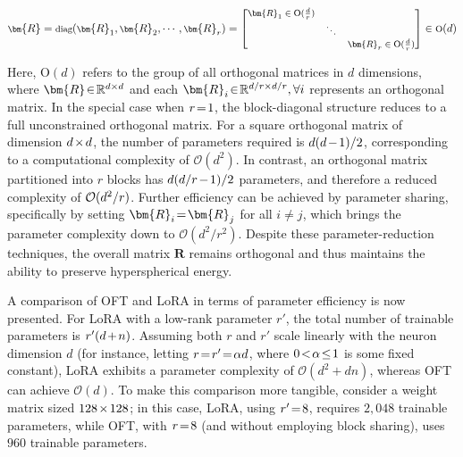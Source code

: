 \begin{equation}
    \footnotesize
    \bm{R} = \text{diag}(\bm{R}_1, \bm{R}_2, \cdots, \bm{R}_r) = \begin{bmatrix}
    \bm{R}_1 \in \text{O}(\frac{d}{r}) & & \\
    & \ddots & \\
    & & \bm{R}_r \in \text{O}(\frac{d}{r})
    \end{bmatrix} \in \text{O}(d)
\end{equation}

Here, $\text{O}(d)$ refers to the group of all orthogonal matrices in $d$ dimensions, where $\thickmuskip=2mu \medmuskip=2mu \bm{R}\in\mathbb{R}^{d\times d}$ and each $\thickmuskip=2mu \medmuskip=2mu \bm{R}_i\in\mathbb{R}^{d/r\times d/r},\forall i$ represents an orthogonal matrix. In the special case when $\thickmuskip=2mu \medmuskip=2mu r=1$, the block-diagonal structure reduces to a full unconstrained orthogonal matrix. For a square orthogonal matrix of dimension $\thickmuskip=2mu \medmuskip=2mu d\times d$, the number of parameters required is $\thickmuskip=2mu \medmuskip=2mu d(d-1)/2$, corresponding to a computational complexity of $\mathcal{O}(d^2)$. In contrast, an orthogonal matrix partitioned into $r$ blocks has $\thickmuskip=2mu \medmuskip=2mu d(d/r-1)/2$ parameters, and therefore a reduced complexity of $\thickmuskip=2mu \medmuskip=2mu \mathcal{O}(d^2/r)$. Further efficiency can be achieved by parameter sharing, specifically by setting $\thickmuskip=2mu \medmuskip=2mu \bm{R}_i = \bm{R}_j$ for all $i \neq j$, which brings the parameter complexity down to $\mathcal{O}(d^2/r^2)$. Despite these parameter-reduction techniques, the overall matrix $\bm{R}$ remains orthogonal and thus maintains the ability to preserve hyperspherical energy.

A comparison of OFT and LoRA in terms of parameter efficiency is now presented. For LoRA with a low-rank parameter $r'$, the total number of trainable parameters is $\thickmuskip=2mu \medmuskip=2mu r'(d+n)$. Assuming both $r$ and $r'$ scale linearly with the neuron dimension $d$ (for instance, letting $\thickmuskip=2mu \medmuskip=2mu r=r'=\alpha d$, where $\thickmuskip=2mu \medmuskip=2mu 0<\alpha\leq 1$ is some fixed constant), LoRA exhibits a parameter complexity of $\mathcal{O}(d^2+dn)$, whereas OFT can achieve $\mathcal{O}(d)$. To make this comparison more tangible, consider a weight matrix sized $\thickmuskip=2mu \medmuskip=2mu 128\times 128$; in this case, LoRA, using $\thickmuskip=2mu \medmuskip=2mu r'=8$, requires $2,048$ trainable parameters, while OFT, with $\thickmuskip=2mu \medmuskip=2mu r=8$ (and without employing block sharing), uses $960$ trainable parameters.

